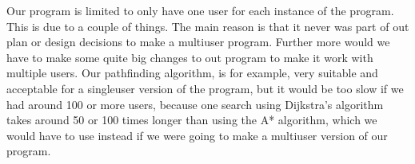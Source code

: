 Our program is limited to only have one user for each instance of the program. This is due to a couple of things. The main reason is that it never was part of out plan or design decisions to make a multiuser program. Further more would we have to make some quite big changes to out program to make it work with multiple users. Our pathfinding algorithm, is for example, very suitable and acceptable for a singleuser version of the program, but it would be too slow if we had around 100 or more users, because one search using Dijkstra's algorithm takes around 50 or 100 times longer than using the A* algorithm, which we would have to use instead if we were going to make a multiuser version of our program.
